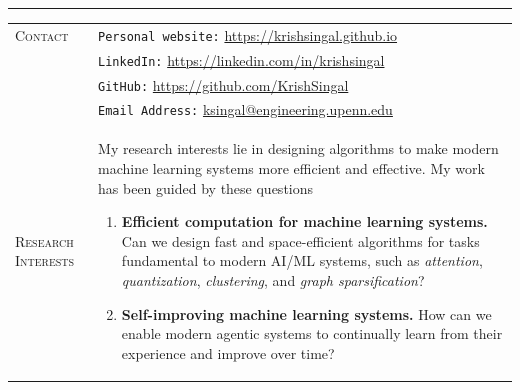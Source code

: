 \documentclass[10pt]{article}
\newlength{\lcol}\setlength{\lcol}{100pt}
\newlength{\rcol}\setlength{\rcol}{\dimexpr\textwidth-\lcol\relax}
\newcommand{\sectionhead}[1]{\textsc{#1}}
\begin{document}

\vspace{2pt}\noindent\rule{\textwidth}{0.4pt}\vspace{2pt}

\setlength{\tabcolsep}{0pt}
\setlength{\LTpre}{0pt}
\setlength{\LTpost}{0pt}

\begin{longtable}{@{}p{\lcol}@{}p{\rcol}@{}}

\sectionhead{Contact} &
\texttt{Personal website:} \href{https://krishsingal.github.io}{https://krishsingal.github.io} \\
& \texttt{LinkedIn:} \href{https://linkedin.com/in/krishsingal}{https://linkedin.com/in/krishsingal}\\
& \texttt{GitHub:} \href{https://github.com/KrishSingal}{https://github.com/KrishSingal} \\
& \texttt{Email Address:} \href{mailto:ksingal@engineering.upenn.edu}{ksingal@engineering.upenn.edu}
\\[10pt]

\sectionhead{Research \newline Interests} &
My research interests lie in designing algorithms to make modern machine learning systems more efficient and effective. My work has been guided by these questions \par \smallskip
\begin{enumerate}[leftmargin=*, itemsep=2pt, topsep=2pt, parsep=0pt]
  \item \textbf{Efficient computation for machine learning systems.} Can we design fast and space-efficient algorithms for tasks fundamental to modern AI/ML systems, such as \textit{attention}, \textit{quantization}, \textit{clustering}, and \textit{graph sparsification}?
  \item \textbf{Self-improving machine learning systems.} How can we enable modern agentic systems to continually learn from their experience and improve over time?
\end{enumerate}
\\[2pt]


\end{longtable}
\end{document}

